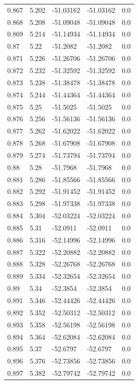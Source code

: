 \begin{tabular}{lllll}
0.867 & 5.202 & -51.03162 & -51.03162 & 0.0 \\
0.868 & 5.208 & -51.09048 & -51.09048 & 0.0 \\
0.869 & 5.214 & -51.14934 & -51.14934 & 0.0 \\
0.87 & 5.22 & -51.2082 & -51.2082 & 0.0 \\
0.871 & 5.226 & -51.26706 & -51.26706 & 0.0 \\
0.872 & 5.232 & -51.32592 & -51.32592 & 0.0 \\
0.873 & 5.238 & -51.38478 & -51.38478 & 0.0 \\
0.874 & 5.244 & -51.44364 & -51.44364 & 0.0 \\
0.875 & 5.25 & -51.5025 & -51.5025 & 0.0 \\
0.876 & 5.256 & -51.56136 & -51.56136 & 0.0 \\
0.877 & 5.262 & -51.62022 & -51.62022 & 0.0 \\
0.878 & 5.268 & -51.67908 & -51.67908 & 0.0 \\
0.879 & 5.274 & -51.73794 & -51.73794 & 0.0 \\
0.88 & 5.28 & -51.7968 & -51.7968 & 0.0 \\
0.881 & 5.286 & -51.85566 & -51.85566 & 0.0 \\
0.882 & 5.292 & -51.91452 & -51.91452 & 0.0 \\
0.883 & 5.298 & -51.97338 & -51.97338 & 0.0 \\
0.884 & 5.304 & -52.03224 & -52.03224 & 0.0 \\
0.885 & 5.31 & -52.0911 & -52.0911 & 0.0 \\
0.886 & 5.316 & -52.14996 & -52.14996 & 0.0 \\
0.887 & 5.322 & -52.20882 & -52.20882 & 0.0 \\
0.888 & 5.328 & -52.26768 & -52.26768 & 0.0 \\
0.889 & 5.334 & -52.32654 & -52.32654 & 0.0 \\
0.89 & 5.34 & -52.3854 & -52.3854 & 0.0 \\
0.891 & 5.346 & -52.44426 & -52.44426 & 0.0 \\
0.892 & 5.352 & -52.50312 & -52.50312 & 0.0 \\
0.893 & 5.358 & -52.56198 & -52.56198 & 0.0 \\
0.894 & 5.364 & -52.62084 & -52.62084 & 0.0 \\
0.895 & 5.37 & -52.6797 & -52.6797 & 0.0 \\
0.896 & 5.376 & -52.73856 & -52.73856 & 0.0 \\
0.897 & 5.382 & -52.79742 & -52.79742 & 0.0 \\

\end{tabular}
